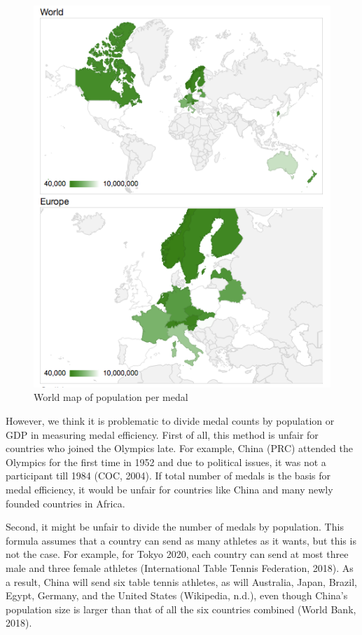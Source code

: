 \documentclass[12pt]{article}
\begin{document}
\begin{figure}[!b]
\begin{minipage}[b]{0.45\textwidth}
    \includegraphics[scale=0.3]{pics/3-6.png}
    \caption{\footnotesize World map of population per medal}
    \label{fig:2}
  \end{minipage}
\end{figure}
\FloatBarrier %

However, we think it is problematic to divide medal counts by population or GDP in measuring medal efficiency. First of all, this method is unfair for countries who joined the Olympics late. For example, China (PRC) attended the Olympics for the first time in 1952 and due to political issues, it was not a participant till 1984 (COC, 2004). If total number of medals is the basis for medal efficiency, it would be unfair for countries like China and many newly founded countries in Africa. 

Second, it might be unfair to divide the number of medals by population. This formula assumes that a country can send as many athletes as it wants, but this is not the case. For example, for Tokyo 2020, each country can send at most three male and three female athletes (International Table Tennis Federation, 2018). As a result, China will send six table tennis athletes, as will Australia, Japan, Brazil, Egypt, Germany, and the United States (Wikipedia, n.d.), even though China’s population size is larger than that of all the six countries combined (World Bank, 2018).
\end{document}
